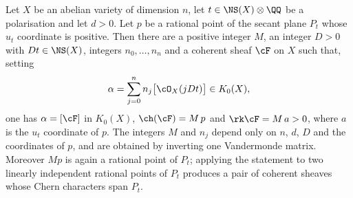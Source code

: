 \begin{theorem}\label{thm:secantexists}
Let $X$ be an abelian variety of dimension $n$, let $t\in\NS(X)\otimes\QQ$ be a
polarisation and let $d>0$. Let $p$ be a rational point of the secant plane
$P_{t}$ whose $u_{t}$ coordinate is positive. Then there are a positive
integer $M$, an integer $D>0$ with $Dt\in\NS(X)$, integers $n_{0},\dots,n_{n}$
and a coherent sheaf $\cF$ on $X$ such that, setting
\begin{equation}\label{eq:lbwitness}
  \alpha=\sum_{j=0}^{n}n_{j}\bigl[\cO_{X}(jDt)\bigr]\in K_{0}(X),
\end{equation}
one has $\alpha=[\cF]$ in $K_{0}(X)$, $\ch(\cF)=M\,p$ and
$\rk\cF=M\,a>0$, where $a$ is the $u_{t}$ coordinate of $p$. The integers $M$
and $n_{j}$ depend only on $n$, $d$, $D$ and the coordinates of $p$, and are
obtained by inverting one Vandermonde matrix. Moreover $Mp$ is again a
rational point of $P_{t}$; applying the statement to two linearly independent
rational points of $P_{t}$ produces a pair of coherent sheaves whose Chern
characters span $P_{t}$.
\end{theorem}

